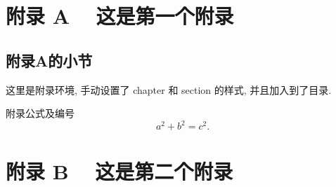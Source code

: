 \documentclass[master]{shnuthesis}
\begin{document}

%
%
%
%
%
%





\appendix

\chapter{附录 A ~ 这是第一个附录}
\renewcommand{\thesection}{A.\arabic{section}} %
\renewcommand{\theequation}{A.\arabic{equation}} %
\renewcommand{\thefigure}{A.\arabic{figure}} %
\setcounter{table}{0}
\renewcommand{\thetable}{A.\arabic{table}} %

\section{附录A的小节}

这里是附录环境, 手动设置了 chapter 和 section 的样式, 并且加入到了目录.

附录公式及编号
\begin{equation}\label{eq:abc}
  a^2+b^2=c^2.
\end{equation}


\chapter{附录 B ~ 这是第二个附录}
\renewcommand{\thesection}{B.\arabic{section}}
\renewcommand{\theequation}{B.\arabic{equation}}
\renewcommand{\thefigure}{B.\arabic{figure}}
\setcounter{table}{0}
\renewcommand{\thetable}{B.\arabic{table}} 
\end{document}
